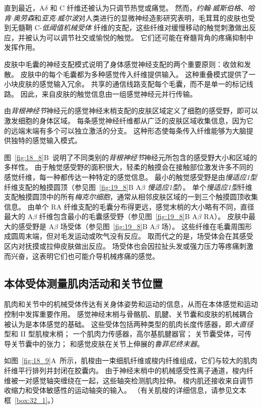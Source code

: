 直到最近，A$\delta$ 和 C 纤维还被认为只调节热觉或痛觉。
然而，\textit{约翰$\cdot$威斯伯格}、\textit{哈肯$\cdot$奥劳森}和\textit{亚克$\cdot$威尔波}对人类进行的显微神经造影研究表明，毛茸茸的皮肤也受到无髓鞘 C-\textit{低阈值机械受体} 纤维的支配，这些纤维对缓慢移动的触觉刺激做出反应，并被认为可以调节社交或愉悦的触觉。
它们还可能在脊髓背角的疼痛抑制中发挥作用。


皮肤中毛囊的神经支配模式说明了身体感觉神经支配的两个重要原则：收敛和发散。
皮肤中的每个毛囊都为多种感觉传入纤维提供输入。
这种重叠模式提供了一小块皮肤的感觉输入冗余。
共享的通信线路支配每个毛囊，而不是单一的标记线路。 
因此，来自皮肤的触觉信息由一组感觉神经元并行传输。


由\textit{背根神经节}神经元的感觉神经末梢支配的皮肤区域定义了细胞的感受野，即可以激发细胞的身体区域。
每条感觉神经纤维都从广泛的皮肤区域收集信息，因为它的远端末端有多个可以独立激活的分支。
这种形态使每条传入纤维能够为大脑提供独特的感觉输入模式。


图~\ref{fig:18_8}B~说明了不同类别的\textit{背根神经节}神经元所包含的感受野大小和区域的多样性。
由于触觉感受野的面积很大，轻柔的触摸会在接触部位激发许多不同的感觉纤维，每一种都传达一种特定的感觉信息。
最小的触觉感受野是由\textit{慢适应1型}纤维支配的触摸圆顶（参见图~\ref{fig:19_8}B A$\beta$ \textit{慢适应1型}）。
单个\textit{慢适应1型}纤维支配触摸圆顶中的所有\textit{梅克尔细胞}，通常从相邻皮肤区域的一到三个触摸圆顶收集信息。
由单个 RA 纤维支配的毛囊分布得更远，感觉末梢的大小略有不同，直径最大的 A$\beta$ 纤维包含最小的毛囊感受野（参见图~\ref{fig:19_8}B A$\beta$ RA）。
皮肤中最大的感受野是 A$\beta$ 场受体（参见图~\ref{fig:19_8}B A$\beta$ 场）。
这些纤维在毛囊周围形成圆周末端，但对毛发运动或吹气没有反应。
取而代之的是，场受体会在其感受区内对抚摸或拉伸皮肤做出反应。
场受体也会因拉扯头发或强力压力等疼痛刺激而兴奋，这表明它们也可能介导机械疼痛的感觉。



\subsection{本体受体测量肌肉活动和关节位置}

肌肉和关节中的机械受体传达有关身体姿势和运动的信息，从而在本体感觉和运动控制中发挥重要作用。
感觉神经末梢与骨骼肌、肌腱、关节囊和皮肤的机械耦合被认为是本体感觉的基础。
这些受体包括两种类型的肌肉长度传感器，即\textit{大直径}型和 II 型肌梭末梢；
一个肌肉力传感器，高尔基肌腱器官；
关节囊受体，可传导关节囊中的张力；
和感觉皮肤在关节上伸展的\textit{鲁菲尼终末器}。


如图~\ref{fig:18_9}A~所示，肌梭由一束细肌纤维或梭内纤维组成，它们与较大的肌肉纤维平行排列并封闭在胶囊内。
由于神经末梢中的机械感受性离子通道，梭内纤维被一对感觉轴突缠绕在一起，这些轴突检测肌肉拉伸。
梭内肌还接收来自调节收缩力和受体敏感性的运动轴突的输入。
（有关肌梭的详细信息，请参见文本框~\ref{box:32_1}。）


